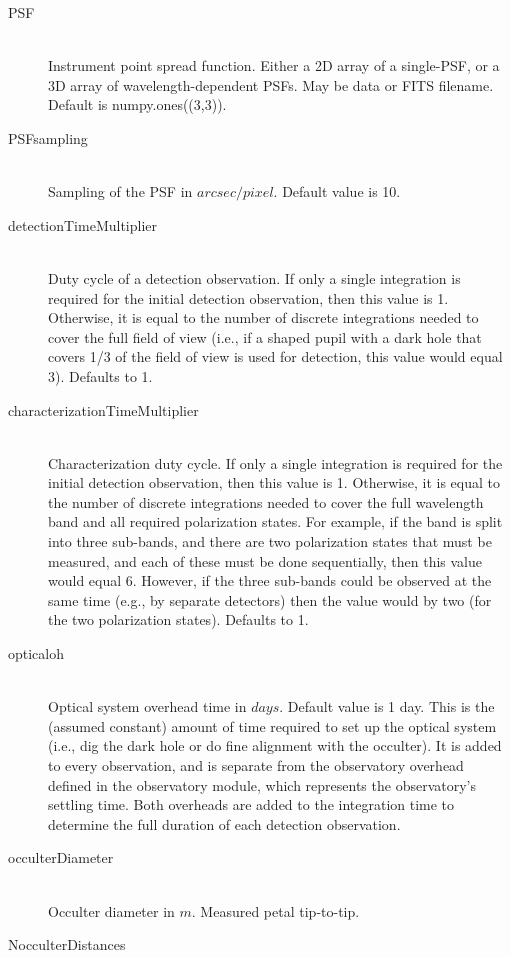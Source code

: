 \documentclass[cleanfoot]{asme2ej}
\begin{document}
\begin{itemize}
\begin{description}
\begin{description}
    \item[PSF] \hfill \\
    Instrument point spread function. Either a 2D array of a single-PSF, or a 3D array of wavelength-dependent PSFs. May be data or FITS filename. Default is numpy.ones((3,3)).
    \item[PSFsampling] \hfill \\
    Sampling of the PSF in $ arcsec/pixel $. Default value is 10.
    \item[detectionTimeMultiplier]\hfill \\
    Duty cycle of a detection observation.  If only a single integration is required for the initial detection observation, then this value is 1.  Otherwise, it is equal to the number of discrete integrations needed to cover the full field of view (i.e., if a shaped pupil with a dark hole that covers 1/3 of the field of view is used for detection, this value would equal 3).  Defaults to 1.
    \item[characterizationTimeMultiplier]\hfill \\
    Characterization duty cycle.  If only a single integration is required for the initial detection observation, then this value is 1.  Otherwise, it is equal to the number of discrete integrations needed to cover the full wavelength band and all required polarization states.  For example, if the band is split into three sub-bands, and there are two polarization states that must be measured, and each of these must be done sequentially, then this value would equal 6.  However, if the three sub-bands could be observed at the same time (e.g., by separate detectors) then the value would by two (for the two polarization states). Defaults to 1.
    \item[opticaloh] \hfill \\
    Optical system overhead time in $ days $.  Default value is 1 day.  This is the (assumed constant) amount of time required to set up the optical system (i.e., dig the dark hole or do fine alignment with the occulter).  It is added to every observation, and is separate from the observatory overhead defined in the observatory module, which represents the observatory's settling time.  Both overheads are added to the integration time to determine the full duration of each detection observation.
    \item[occulterDiameter]\hfill \\
    Occulter diameter in $ m $.  Measured petal tip-to-tip.
    \item [NocculterDistances]\hfill \\

\end{description}
\end{description}
\end{itemize}
\end{document}
